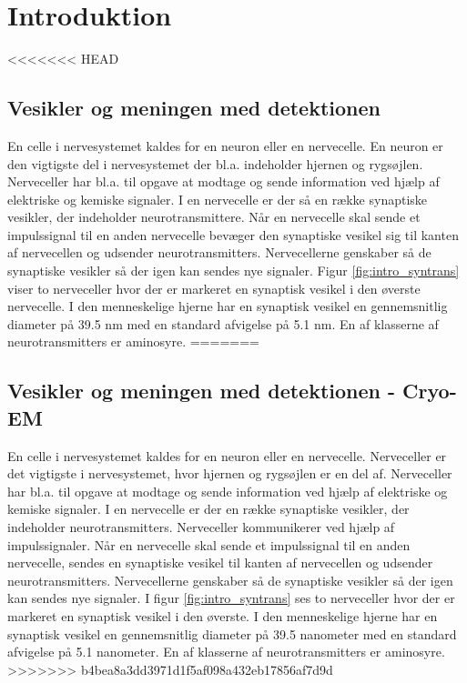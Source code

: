\section{Introduktion}
<<<<<<< HEAD
\subsection{Vesikler og meningen med detektionen}
En celle i nervesystemet kaldes for en neuron eller en nervecelle.
En neuron er den vigtigste del i nervesystemet der bl.a. indeholder hjernen og rygsøjlen.
Nerveceller har bl.a. til opgave at modtage og sende information ved hjælp af elektriske og kemiske signaler.
I en nervecelle er der så en række synaptiske vesikler, der indeholder neurotransmittere.
Når en nervecelle skal sende et impulssignal til en anden nervecelle bevæger den synaptiske vesikel sig til kanten af nervecellen og udsender neurotransmitters.
Nervecellerne genskaber så de synaptiske vesikler så der igen kan sendes nye signaler.
Figur \ref{fig:intro_syntrans} viser to nerveceller hvor der er markeret en synaptisk vesikel i den øverste nervecelle.
I den menneskelige hjerne har en synaptisk vesikel en gennemsnitlig diameter på 39.5 nm med en standard afvigelse på 5.1 nm.
En af klasserne af neurotransmitters er aminosyre.  
=======
\subsection{Vesikler og meningen med detektionen - Cryo-EM}
En celle i nervesystemet kaldes for en neuron eller en nervecelle. Nerveceller er det vigtigste i nervesystemet, hvor hjernen og rygsøjlen er en del af. Nerveceller har bl.a. til opgave at modtage og sende information ved hjælp af elektriske og kemiske signaler. I en nervecelle er der en række synaptiske vesikler, der indeholder neurotransmitters. Nerveceller kommunikerer ved hjælp af impulssignaler. Når en nervecelle skal sende et impulssignal til en anden nervecelle, sendes en synaptiske vesikel til kanten af nervecellen og udsender neurotransmitters. Nervecellerne genskaber så de synaptiske vesikler så der igen kan sendes nye signaler. I figur \ref{fig:intro_syntrans} ses to nerveceller hvor der er markeret en synaptisk vesikel i den øverste. I den menneskelige hjerne har en synaptisk vesikel en gennemsnitlig diameter på 39.5 nanometer med en standard afvigelse på 5.1 nanometer. En af klasserne af neurotransmitters er aminosyre.
>>>>>>> b4bea8a3dd3971d1f5af098a432eb17856af7d9d

